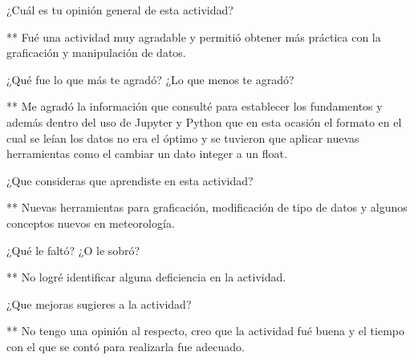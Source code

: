 \documentclass{article} %
\begin{document}
\hspace{0.45 cm} ¿Cuál es tu opinión general de esta actividad?
\vspace{0.5 cm}

** Fué una actividad muy agradable y permitió obtener más práctica con la graficación y manipulación de datos.
\vspace{0.5 cm}

¿Qué fue lo que más te agradó? ¿Lo que menos te agradó?
\vspace{0.5 cm}

** Me agradó la información que consulté para establecer los fundamentos y además dentro del uso de Jupyter y Python que en esta ocasión el formato en el cual se leían los datos no era el óptimo y se tuvieron que aplicar nuevas herramientas como el cambiar un dato integer a un float. 
\vspace{0.5 cm}


¿Que consideras que aprendiste en esta actividad? 
\vspace{0.5 cm}

** Nuevas herramientas para graficación, modificación de tipo de datos y algunos conceptos nuevos en meteorología.
\vspace{0.5 cm}


¿Qué le faltó? ¿O le sobró?  
\vspace{0.5 cm}

** No logré identificar alguna deficiencia en la actividad.
\vspace{0.5 cm}


¿Que mejoras sugieres a la actividad?
\vspace{0.5 cm}

** No tengo una opinión al respecto, creo que la actividad fué buena y el tiempo con el que se contó para realizarla fue adecuado. 
\vspace{0.5 cm}


 
\end{document}

